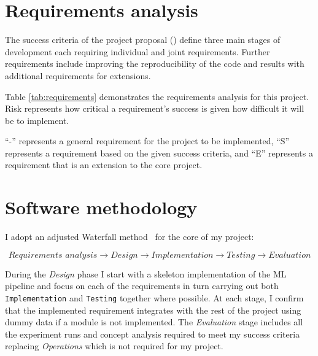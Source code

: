 \section{Requirements analysis}


The success criteria of the project proposal () define three main stages of development each requiring individual and joint requirements.
Further requirements include improving the reproducibility of the code and results with additional requirements for extensions.

Table \ref{tab:requirements} demonstrates the requirements analysis for this project.
Risk represents how critical a requirement's success is given how difficult it will be to implement.

``-'' represents a general requirement for the project to be implemented, ``S'' represents a requirement based on the given success criteria, and ``E'' represents a requirement that is an extension to the core project.



\section{Software methodology}


I adopt an adjusted Waterfall method~\cite{royce1970managing} for the core of my project:

\begin{equation*}
    \textit{Requirements analysis} \longrightarrow \textit{Design} \longrightarrow \textit{Implementation} \longrightarrow \textit{Testing} \longrightarrow \textit{Evaluation}
\end{equation*}

During the \textit{Design} phase I start with a skeleton implementation of the ML pipeline and focus on each of the requirements in turn carrying out both \texttt{Implementation} and \texttt{Testing} together where possible.
At each stage, I confirm that the implemented requirement integrates with the rest of the project using dummy data if a module is not implemented.
The \textit{Evaluation} stage includes all the experiment runs and concept analysis required to meet my success criteria replacing \textit{Operations} which is not required for my project.

